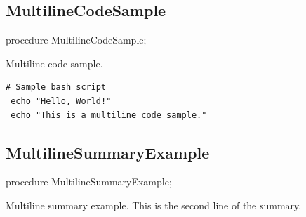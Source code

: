 \documentclass{report}
\newif\ifpdf
\begin{document}
\subsection*{MultilineCodeSample}
\fi
\label{ok_helpinsight_comments-MultilineCodeSample}
\begin{list}{}{
\setlength{\itemindent}{0cm}
\setlength{\listparindent}{0cm}
\setlength{\leftmargin}{\evensidemargin}
\addtolength{\leftmargin}{\tmplength}
\settowidth{\labelsep}{X}
\addtolength{\leftmargin}{\labelsep}
\setlength{\labelwidth}{\tmplength}
}
\item[\textbf{Declaration}\hfill]
\ifpdf
\begin{flushleft}
\fi
\begin{ttfamily}
procedure MultilineCodeSample;\end{ttfamily}

\ifpdf
\end{flushleft}
\fi

\par
\item[\textbf{Description}]
Multiline code sample.\hfill\vspace*{1ex}

 \begin{verbatim}# Sample bash script
 echo "Hello, World!"
 echo "This is a multiline code sample."\end{verbatim}

\end{list}
\ifpdf
\subsection*{\large{\textbf{MultilineSummaryExample}}\normalsize\hspace{1ex}\hrulefill}
\else
\subsection*{MultilineSummaryExample}
\fi
\label{ok_helpinsight_comments-MultilineSummaryExample}
\begin{list}{}{
\setlength{\itemindent}{0cm}
\setlength{\listparindent}{0cm}
\setlength{\leftmargin}{\evensidemargin}
\addtolength{\leftmargin}{\tmplength}
\settowidth{\labelsep}{X}
\addtolength{\leftmargin}{\labelsep}
\setlength{\labelwidth}{\tmplength}
}
\item[\textbf{Declaration}\hfill]
\ifpdf
\begin{flushleft}
\fi
\begin{ttfamily}
procedure MultilineSummaryExample;\end{ttfamily}

\ifpdf
\end{flushleft}
\fi

\par
\item[\textbf{Description}]
 Multiline summary example. This is the second line of the summary. 

\end{list}
\end{document}
